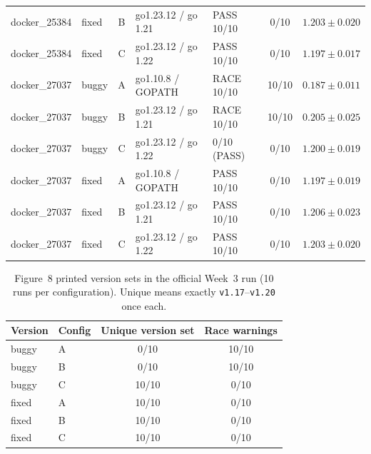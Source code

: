 \begin{landscape}
\begin{table}[p]
\begin{tabularx}{\linewidth}{L{2.5cm}L{1.2cm}c L{4.1cm}Ycc}
    docker\_25384 & fixed & B & go1.23.12 / go 1.21  & PASS 10/10     & 0/10 & $1.203 \pm 0.020$ \\
    docker\_25384 & fixed & C & go1.23.12 / go 1.22  & PASS 10/10     & 0/10 & $1.197 \pm 0.017$ \\
    docker\_27037 & buggy & A & go1.10.8 / GOPATH     & RACE 10/10     & 10/10 & $0.187 \pm 0.011$ \\
    docker\_27037 & buggy & B & go1.23.12 / go 1.21  & RACE 10/10     & 10/10 & $0.205 \pm 0.025$ \\
    docker\_27037 & buggy & C & go1.23.12 / go 1.22  & 0/10 (PASS)    & 0/10 & $1.200 \pm 0.019$ \\
    docker\_27037 & fixed & A & go1.10.8 / GOPATH     & PASS 10/10     & 0/10 & $1.197 \pm 0.019$ \\
    docker\_27037 & fixed & B & go1.23.12 / go 1.21  & PASS 10/10     & 0/10 & $1.206 \pm 0.023$ \\
    docker\_27037 & fixed & C & go1.23.12 / go 1.22  & PASS 10/10     & 0/10 & $1.203 \pm 0.020$ \\
    \bottomrule
  \end{tabularx}
\end{table}
\end{landscape}

\begin{table}[H]
  \centering
  \caption{Figure~8 printed version sets in the official Week~3 run
    (10 runs per configuration). Unique means exactly
    \texttt{v1.17}--\texttt{v1.20} once each.}
  \label{tab:extension-versions}
  \small
  \begin{tabular}{llcc}
    \toprule
    Version & Config & Unique version set & Race warnings \\
    \midrule
    buggy & A & 0/10 & 10/10 \\
    buggy & B & 0/10 & 10/10 \\
    buggy & C & 10/10 & 0/10 \\
    fixed & A & 10/10 & 0/10 \\
    fixed & B & 10/10 & 0/10 \\
    fixed & C & 10/10 & 0/10 \\
    \bottomrule
  \end{tabular}
\end{table}
